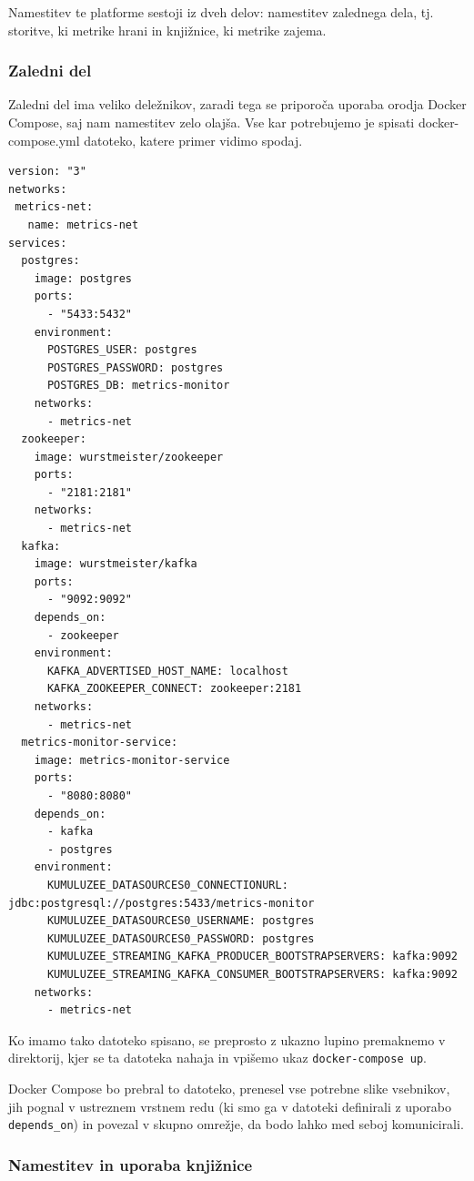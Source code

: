 \documentclass[a4paper, 12pt]{book}
\begin{document}
Namestitev te platforme sestoji iz dveh delov: namestitev zalednega dela, tj. storitve, ki metrike hrani in knjižnice, ki metrike zajema.

\subsubsection{Zaledni del}

Zaledni del ima veliko deležnikov, zaradi tega se priporoča uporaba orodja Docker Compose, saj nam namestitev zelo olajša. Vse kar potrebujemo je spisati docker-compose.yml datoteko, katere primer vidimo spodaj.

\begin{lstlisting}[label=docker_compose, caption=Primer datoteke docker-compose.yml]
version: "3"
networks:
 metrics-net:
   name: metrics-net
services:
  postgres:
    image: postgres
    ports:
      - "5433:5432"
    environment:
      POSTGRES_USER: postgres
      POSTGRES_PASSWORD: postgres
      POSTGRES_DB: metrics-monitor
    networks:
      - metrics-net
  zookeeper:
    image: wurstmeister/zookeeper
    ports:
      - "2181:2181"
    networks:
      - metrics-net
  kafka:
    image: wurstmeister/kafka
    ports:
      - "9092:9092"
    depends_on:
      - zookeeper
    environment:
      KAFKA_ADVERTISED_HOST_NAME: localhost
      KAFKA_ZOOKEEPER_CONNECT: zookeeper:2181
    networks:
      - metrics-net
  metrics-monitor-service:
    image: metrics-monitor-service
    ports:
      - "8080:8080"
    depends_on:
      - kafka
      - postgres
    environment:
      KUMULUZEE_DATASOURCES0_CONNECTIONURL: jdbc:postgresql://postgres:5433/metrics-monitor
      KUMULUZEE_DATASOURCES0_USERNAME: postgres
      KUMULUZEE_DATASOURCES0_PASSWORD: postgres
      KUMULUZEE_STREAMING_KAFKA_PRODUCER_BOOTSTRAPSERVERS: kafka:9092
      KUMULUZEE_STREAMING_KAFKA_CONSUMER_BOOTSTRAPSERVERS: kafka:9092
    networks:
      - metrics-net
\end{lstlisting}

Ko imamo tako datoteko spisano, se preprosto z ukazno lupino premaknemo v direktorij, kjer se ta datoteka nahaja in vpišemo ukaz \verb|docker-compose up|.

Docker Compose bo prebral to datoteko, prenesel vse potrebne slike vsebnikov, jih pognal v ustreznem vrstnem redu (ki smo ga v datoteki definirali z uporabo \verb|depends_on|) in povezal v skupno omrežje, da bodo lahko med seboj komunicirali.

\subsubsection{Namestitev in uporaba knjižnice}
\end{document}
